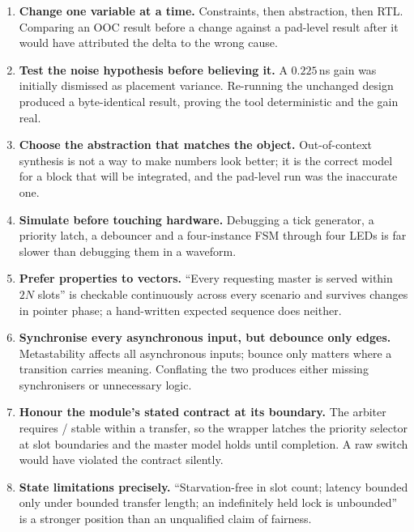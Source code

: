 \documentclass[11pt,a4paper]{article}
\newcommand{\sig}[1]{\texttt{\detokenize{#1}}}
\begin{document}
\begin{enumerate}[leftmargin=1.6em,itemsep=5pt]
\item \textbf{Change one variable at a time.} Constraints, then abstraction,
      then RTL. Comparing an OOC result before a change against a pad-level
      result after it would have attributed the delta to the wrong cause.

\item \textbf{Test the noise hypothesis before believing it.} A $0.225$\,ns gain
      was initially dismissed as placement variance. Re-running the unchanged
      design produced a byte-identical result, proving the tool deterministic
      and the gain real.

\item \textbf{Choose the abstraction that matches the object.} Out-of-context
      synthesis is not a way to make numbers look better; it is the correct
      model for a block that will be integrated, and the pad-level run was the
      inaccurate one.

\item \textbf{Simulate before touching hardware.} Debugging a tick generator, a
      priority latch, a debouncer and a four-instance FSM through four LEDs is
      far slower than debugging them in a waveform.

\item \textbf{Prefer properties to vectors.} ``Every requesting master is served
      within $2N$ slots'' is checkable continuously across every scenario and
      survives changes in pointer phase; a hand-written expected sequence does
      neither.

\item \textbf{Synchronise every asynchronous input, but debounce only edges.}
      Metastability affects all asynchronous inputs; bounce only matters where a
      transition carries meaning. Conflating the two produces either missing
      synchronisers or unnecessary logic.

\item \textbf{Honour the module's stated contract at its boundary.} The arbiter
      requires \sig{REQ}/\sig{PRI} stable within a transfer, so the wrapper
      latches the priority selector at slot boundaries and the master model
      holds \sig{REQ} until completion. A raw switch would have violated the
      contract silently.

\item \textbf{State limitations precisely.} ``Starvation-free in slot count;
      latency bounded only under bounded transfer length; an indefinitely held
      lock is unbounded'' is a stronger position than an unqualified claim of
      fairness.

\end{enumerate}
\end{document}
